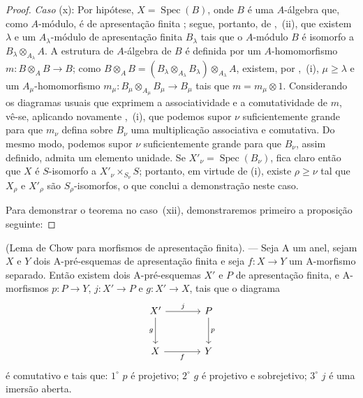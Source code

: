 \begin{proof}
\emph{Caso} (x): Por hipótese, $X=\operatorname{Spec}(B)$, onde $B$ é uma $A$-álgebra que, como $A$-módulo, é de apresentação finita ; segue, portanto, de ,~(ii), que existem $\lambda$ e um $A_\lambda$-módulo de apresentação finita $B_\lambda$ tais que o $A$-módulo $B$ é isomorfo a $B_\lambda\otimes_{A_\lambda}A$.
A estrutura de $A$-álgebra de $B$ é definida por um $A$-homomorfismo $m:B\otimes_A B\to B$; como $B\otimes_A B=(B_\lambda\otimes_{A_\lambda}B_\lambda)\otimes_{A_\lambda} A$, existem, por ,~(i), $\mu\geqslant\lambda$ e um $A_\mu$-homomorfismo $m_\mu:B_\mu\otimes_{A_\mu}B_\mu\to B_\mu$ tais que $m=m_\mu\otimes 1$.
Considerando os diagramas usuais que exprimem a associatividade e a comutatividade de $m$, vê-se, aplicando novamente ,~(i), que podemos supor $\nu$ suficientemente grande para que $m_\nu$ defina sobre $B_\nu$ uma multiplicação associativa e comutativa.
Do mesmo modo, podemos supor $\nu$ suficientemente grande para que $B_\nu$, assim definido, admita um elemento unidade.
Se $X'_\nu=\operatorname{Spec}(B_\nu)$, fica claro então que $X$ é $S$-isomorfo a $X'_\nu\times_{S_\nu}S$; portanto, em virtude de (i), existe $\rho\geqslant\nu$ tal que $X_\rho$ e $X'_\rho$ são $S_\rho$-isomorfos, o que conclui a demonstração neste caso.

Para demonstrar o teorema no caso~(xii), demonstraremos primeiro a proposição seguinte:
\end{proof}

\begin{proposition}[8.10.5.1]
\label{IV.8.10.5.1}
(Lema de Chow para morfismos de apresentação finita). --- Seja $\mathrm{A}$ um anel, sejam $X$ e $Y$ dois $\mathrm{A}$-pré-esquemas de apresentação finita e seja $f:X\to Y$ um $\mathrm{A}$-morfismo separado. Então existem dois $\mathrm{A}$-pré-esquemas $X'$ e $P$ de apresentação finita, e $\mathrm{A}$-morfismos $p:P\to Y$, $j:X'\to P$ e $g:X'\to X$, tais que o diagrama
\[
\begin{tikzcd}[column sep=large,row sep=large]
X' \arrow[r,"j"] \arrow[d,"g"'] & P \arrow[d,"p"] \\
X \arrow[r,"f"'] & Y
\end{tikzcd}
\]
é comutativo e tais que: $1^\circ$ $p$ é projetivo; $2^\circ$ $g$ é projetivo e sobrejetivo; $3^\circ$ $j$ é uma imersão aberta.
\end{proposition}

